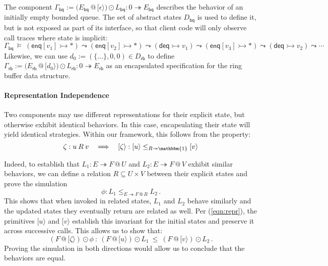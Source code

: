 \documentclass[acmsmall,screen,review,nonacm]{acmart}
\newcommand{\kw}[1]{\ensuremath{ \mathsf{#1} }}
\newcommand{\emptysig}{0}
\begin{document}
\begin{example} \label{ex:encaps} %
The component
$\Gamma_\kw{bq} :=
 \bigl(E_\kw{bq} \mathbin@ [\epsilon\rangle\bigr) \odot L_\kw{bq} :
 \emptysig \twoheadrightarrow E_\kw{bq}$
describes the behavior of an initially empty bounded queue.
The set of abstract states $D_\kw{bq}$ is used to define it,
but is not exposed as part of its interface,
so that client code will only observe call traces
where state is implicit:
{\small\[
  \Gamma_\kw{bq} \: \vDash \:
    (\kw{enq}[v_1] \rightarrowtail {*}) \leadsto
    (\kw{enq}[v_2] \rightarrowtail {*}) \leadsto
    (\kw{deq} \rightarrowtail v_1) \leadsto
    (\kw{enq}[v_3] \rightarrowtail {*}) \leadsto
    (\kw{deq} \rightarrowtail v_2) \leadsto \cdots
\]}%
Likewise,
we can use
$d_0 := (\{\ldots\}, 0, 0) \in D_\kw{rb}$
to define
$\Gamma_\kw{rb} :=
 \bigl( E_\kw{rb} \mathbin@ [d_0\rangle \bigr) \odot L_\kw{rb} :
 \emptysig \twoheadrightarrow E_\kw{rb}$
as an encapsulated specification for
the ring buffer data structure.
\end{example}

\paragraph{Representation Independence} %

Two components may use different representations
for their explicit state,
but otherwise exhibit identical behaviors.
In this case,
encapsulating their state will yield identical strategies.
Within our framework,
this follows from the property:
\begin{equation} \label{eqn:repr}
  \zeta : u \mathbin{R} v
  \quad\Longrightarrow\quad
  [\zeta\rangle : [u\rangle \le_{R \twoheadrightarrow \mathbbm{1}} [v\rangle
\end{equation}

Indeed,
to establish that
$L_1 : E \twoheadrightarrow F \mathbin@ U$ and
$L_2 : E \twoheadrightarrow F \mathbin@ V$
exhibit similar behaviors,
we can define a relation $R \subseteq U \times V$
between their explicit states and prove the simulation
\[
  \phi : L_1 \le_{E \twoheadrightarrow F \mathbin@ R} L_2
  \,.
\]
This shows that when invoked in related states,
$L_1$ and $L_2$ behave similarly and
the updated states they eventually return are related as well.
Per (\ref{eqn:repr}),
the primitives $[u\rangle$ and $[v\rangle$
establish this invariant for the initial states
and preserve it across successive calls.
This allows us to show that:
\[
  (F \mathbin@ [\zeta\rangle) \odot \phi \: : \:
  (F \mathbin@ [u\rangle) \odot L_1 \: \le \:
  (F \mathbin@ [v\rangle) \odot L_2
  \,.
\]
Proving the simulation in both directions
would allow us to conclude that the behaviors are equal.
\end{document}
